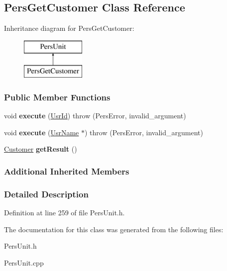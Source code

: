 \hypertarget{classPersGetCustomer}{\subsection{Pers\-Get\-Customer Class Reference}
\label{df/dac/classPersGetCustomer}
}
Inheritance diagram for Pers\-Get\-Customer\-:\begin{figure}[H]
\begin{center}
\leavevmode
\includegraphics[height=2.000000cm]{df/dac/classPersGetCustomer}
\end{center}
\end{figure}
\subsubsection*{Public Member Functions}
\begin{DoxyCompactItemize}
\item 
\hypertarget{classPersGetCustomer_a67103ecb49882a8287849fa649cc9047}{void {\bfseries execute} (\hyperlink{classUsrId}{Usr\-Id})  throw (\-Pers\-Error, invalid\-\_\-argument)}\label{df/dac/classPersGetCustomer_a67103ecb49882a8287849fa649cc9047}

\item 
\hypertarget{classPersGetCustomer_a8d72d5fab3bc9c78b1e4af33e535b89f}{void {\bfseries execute} (\hyperlink{classUsrName}{Usr\-Name} $\ast$)  throw (\-Pers\-Error, invalid\-\_\-argument)}\label{df/dac/classPersGetCustomer_a8d72d5fab3bc9c78b1e4af33e535b89f}

\item 
\hypertarget{classPersGetCustomer_af2a4db3c8752ba68d81f50bc06afbe21}{\hyperlink{classCustomer}{Customer} {\bfseries get\-Result} ()}\label{df/dac/classPersGetCustomer_af2a4db3c8752ba68d81f50bc06afbe21}

\end{DoxyCompactItemize}
\subsubsection*{Additional Inherited Members}


\subsubsection{Detailed Description}


Definition at line 259 of file Pers\-Unit.\-h.



The documentation for this class was generated from the following files\-:\begin{DoxyCompactItemize}
\item 
Pers\-Unit.\-h\item 
Pers\-Unit.\-cpp\end{DoxyCompactItemize}
